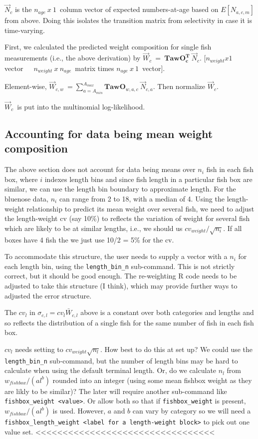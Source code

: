 \documentclass[a4paper,11pt,twoside,pdftex,draft]{article}
\begin{document}
$\overrightarrow N_{c}$ is the $n_{age}\ x\ 1$\ column vector of expected numbers-at-age based on $E[N_{a,c,m}]$ from above. Doing this isolates the transition matrix from selectivity in case it is time-varying.

First, we calculated the predicted weight composition for single fish measurements (i.e., the above derivation) by $\overrightarrow W_{c}\ =\ \mathbf{TawO_{c}^T}\ \overrightarrow N_{c}$.
[$n_{weight}x1$ vector\ \ \ $n_{weight}\ x\ n_{age}$\ matrix times $n_{age}\ x\ 1$\ vector]. 

Element-wise, $\overrightarrow W_{c,w}\ = \sum_{a=A_{min}}^{A_{max}}  \mathbf{TawO}_{w,a,c}  \ \overrightarrow N_{c,a}$.
Then normalize $\overrightarrow W_{c}$.

$\overrightarrow W_{c}$\ is put into the multinomial log-likelihood. 


\subsection{Accounting for data being mean weight composition}

The above section does not account for data being means over $n_i$ fish in each fish box, where $i$ indexes length bins and since fish length  in a particular fish box are similar, we can use the length bin boundary to approximate length. For the bluenose data, $n_i$ can range from 2 to 18, with a median of 4. 
Using the length-weight relationship to predict its mean weight over several fish, we need to adjust the 
 length-weight cv (say 10\%) to reflects the variation of weight for several fish which are likely to be at similar lengths, i.e., we should us $cv_{weight}/\sqrt{n_{i}}$. If all boxes have 4 fish the we just use 10/2 = 5\% for the cv.

To accommodate this structure, the user needs to supply a vector with a $n_i$ for each length bin, using the \texttt{length\_bin\_n} sub-command. This is not strictly correct, but it should be good enough. The re-weighting R code needs to be adjusted to take this structure (I think), which may provide further ways to adjusted the error structure.

The $cv_{l}$ in $\sigma_{c,l}= cv_{l} \bar W_{c,l}$ above is a constant over both categories and lengths and so reflects the distribution of a single fish for the same number of fish in each fish box.
 
$cv_{l}$ needs setting to $ cv_{weight} \sqrt{n_{l}}$. How 
best to do this at set up? We could use the \texttt{length\_bin\_n} sub-command, but the number of length bins may be hard to calculate when using the default terminal length. Or, do we  calculate $n_{l}$ from 
$ w_{fish box}/ (a l^{b}) $ rounded into an integer (using some mean fishbox weight as they are likly to be similar)? The later will require another sub-command like \texttt{fishbox\_weight <value>}. Or allow both so that if \texttt{fishbox\_weight} is present, $ w_{fish box}/ (a l^{b}) $ is used. However, $a$ and $b$ can vary by category so we will need a \texttt{fishbox\_length\_weight <label for a length-weight block>} to pick out one value set. <<<<<<<<<<<<<<<<<<<<<<<<<<<<<<<<<
\end{document}
